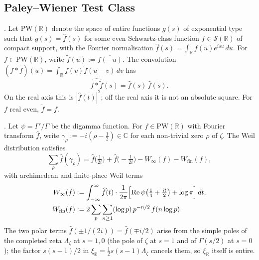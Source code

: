 \subsection{Paley--Wiener Test Class}
\label{v4-arith:w5-a:weil-explicit:PW}

\begin{definition}
\label{v4-arith:w5-a:def:PW}
\ClaimStatusDefinitional. Let \(\mathrm{PW}(\mathbb{R})\) denote the
space of entire functions \(g(s)\) of exponential type such that
\(g(s)=\widehat{f}(s)\) for some even Schwartz-class function
\(f\in\mathcal{S}(\mathbb{R})\) of compact support, with the Fourier
normalisation \(\widehat{f}(s)=\int_{\mathbb{R}}f(u)e^{isu}\,du\). For
\(f\in\mathrm{PW}(\mathbb{R})\), write \(\widetilde{f}(u):=\overline{f(-u)}\).
The convolution
\((f*\widetilde{f})(u)=\int_{\mathbb{R}}f(v)\widetilde{f}(u-v)\,dv\) has
\[
\widehat{f*\widetilde{f}}(s)=
\widehat f(s)\,\overline{\widehat f(\overline s)}.
\]
On the real axis this is \(|\widehat f(t)|^2\); off the real axis it is
not an absolute square. For \(f\) real even, \(\widetilde{f}=f\).
\end{definition}

\begin{theorem}
\label{v4-arith:w5-a:thm:weil-explicit}
\ClaimStatusProvedElsewhere. Let \(\psi=\Gamma'/\Gamma\) be the
digamma function. For \(f\in\mathrm{PW}(\mathbb{R})\) with
Fourier transform \(\widehat{f}\), write
\(\gamma_{\rho}:=-i(\rho-\tfrac12)\in\mathbb C\) for each non-trivial
zero \(\rho\) of \(\zeta\). The Weil distribution satisfies
\begin{equation}
\label{v4-arith:w5-a:eq:weil-explicit}
\sum_{\rho}\widehat{f}(\gamma_{\rho})
=\widehat{f}\bigl(\tfrac{1}{2i}\bigr)+\widehat{f}\bigl(-\tfrac{1}{2i}\bigr)
-W_{\infty}(f)-W_{\mathrm{fin}}(f),
\end{equation}
with archimedean and finite-place Weil terms
\begin{align}
\label{v4-arith:w5-a:eq:weil-archimedean}
W_{\infty}(f)&:=\int_{-\infty}^{\infty}\widehat{f}(t)\cdot\frac{1}{2\pi}\Bigl[\mathrm{Re}\,\psi\bigl(\tfrac{1}{4}+\tfrac{it}{2}\bigr)+\log\pi\Bigr]\,dt,\\
\label{v4-arith:w5-a:eq:weil-finite}
W_{\mathrm{fin}}(f)&:=2\sum_{p}\sum_{n\geq 1}(\log p)\,p^{-n/2}\,f(n\log p).
\end{align}
The two polar terms \(\widehat{f}(\pm 1/(2i))=\widehat{f}(\mp i/2)\)
arise from the simple poles of the completed zeta \(\Lambda_{\zeta}\) at
\(s=1,0\) (the pole of \(\zeta\) at \(s=1\) and of \(\Gamma(s/2)\) at
\(s=0\)); the factor \(s(s-1)/2\) in \(\xi_{\mathbb{R}}=\tfrac12 s(s-1)\Lambda_{\zeta}\)
cancels them, so \(\xi_{\mathbb{R}}\) itself is entire.
\end{theorem}

